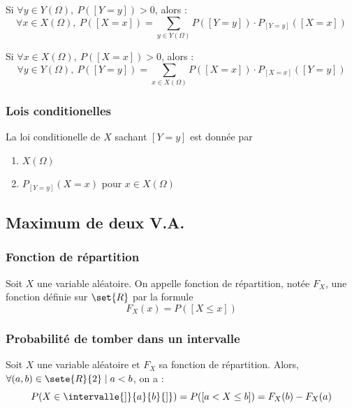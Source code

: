             Si $\forall y \in Y(\Omega),\ P([Y = y]) > 0$, alors : 
            \begin{equation*}
                \forall x \in X(\Omega),\ P([X = x]) = \sum_{y \in Y(\Omega)} P([Y = y]) \cdot P_{[Y = y]}([X = x])
            \end{equation*}

            Si $\forall x \in X(\Omega),\ P([X = x]) > 0$, alors : 
            \begin{equation*}
                \forall y \in Y(\Omega),\ P([Y = y]) = \sum_{x \in X(\Omega)} P([X = x]) \cdot P_{[X = x]}([Y = y])
            \end{equation*}

        \subsubsection{Lois conditionelles}
            La loi conditionelle de $X$ sachant $[Y = y]$ est donnée par 
            \begin{enumerate}
                \item $X(\Omega)$
                \item $P_{[Y = y]}(X = x)$ pour $x \in X(\Omega)$
            \end{enumerate}

    \subsection{Maximum de deux V.A.}

        \subsubsection{Fonction de répartition}
            Soit $X$ une variable aléatoire. On appelle fonction de répartition, notée
            $F_X$, une fonction définie sur $\set{R}$ par la formule 
            \[
                F_X(x) = P([X \leq x])
            \]

        \subsubsection{Probabilité de tomber dans un intervalle}
            Soit $X$ une variable aléatoire et $F_X$ sa fonction de répartition. Alors, 
            $\forall (a,b) \in \sete{R}{2} \mid a < b$, on a :
            \[
                P(X \in \intervalle{]}{a}{b}{]}) = P([a < X \leq b]) = F_X(b) - F_X(a)
            \]
        
